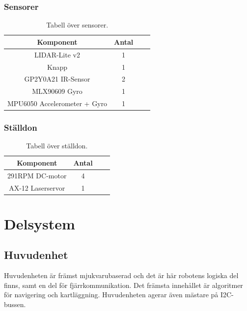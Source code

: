 \documentclass{article}
\begin{document}
\subsubsection{Sensorer}
\begin{table}[H]
  \centering
  \begin{tabular}{ | c | c | c | c |}
    \hline
    \textbf{Komponent} & \textbf{Antal} \\
    \hline
    LIDAR-Lite v2 & 1 \\
    \hline
    Knapp & 1 \\
    \hline
    GP2Y0A21 IR-Sensor & 2 \\
    \hline
    MLX90609 Gyro & 1 \\
    \hline
    MPU6050 Accelerometer + Gyro & 1 \\
    \hline
  \end{tabular}
  \caption{ Tabell över sensorer. }
\end{table}

\subsubsection{Ställdon}
\begin{table}[H]
  \centering
  \begin{tabular}{ | c | c | c | c |}
    \hline
    \textbf{Komponent} & \textbf{Antal} \\
    \hline
    291RPM DC-motor & 4 \\
    \hline
    AX-12 Laserservor & 1 \\
    \hline
  \end{tabular}
  \caption{ Tabell över ställdon. }
\end{table}

\clearpage

\section{Delsystem}

\subsection{Huvudenhet}

Huvudenheten är främst mjukvarubaserad och det är här robotens logiska del finns, samt en del för fjärrkommunikation. Det främsta innehållet är algoritmer för navigering och kartläggning. Huvudenheten agerar även mästare på I2C-bussen.
\end{document}
